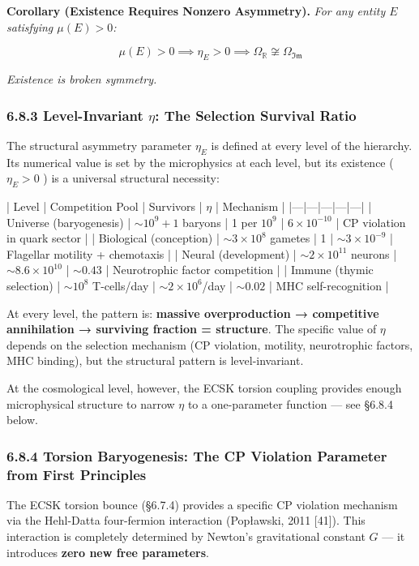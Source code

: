 \documentclass[11pt,a4paper]{article}
\theoremstyle{definition}
\theoremstyle{remark}
\begin{document}
\textbf{Corollary (Existence Requires Nonzero Asymmetry).} \textit{For any entity $E$ satisfying $\mu(E) > 0$:}


\begin{equation}
\mu(E) > 0 \implies \eta_E > 0 \implies \Omega_{\mathbb{R}} \not\cong \Omega_{\mathfrak{Im}}
\end{equation}


\textit{Existence is broken symmetry.}

\subsubsection{6.8.3 Level-Invariant $\eta$: The Selection Survival Ratio}

The structural asymmetry parameter $\eta_E$ is defined at every level of the hierarchy. Its numerical value is set by the microphysics at each level, but its existence ( $\eta_E > 0$ ) is a universal structural necessity:

| Level | Competition Pool | Survivors | $\eta$ | Mechanism |
|---|---|---|---|---|
| Universe (baryogenesis) | $\sim 10^9 + 1$ baryons | 1 per $10^9$ | $6 \times 10^{-10}$ | CP violation in quark sector |
| Biological (conception) | $\sim 3 \times 10^8$ gametes | 1 | $\sim 3 \times 10^{-9}$ | Flagellar motility + chemotaxis |
| Neural (development) | $\sim 2 \times 10^{11}$ neurons | $\sim 8.6 \times 10^{10}$ | $\sim 0.43$ | Neurotrophic factor competition |
| Immune (thymic selection) | $\sim 10^8$ T-cells/day | $\sim 2 \times 10^6$/day | $\sim 0.02$ | MHC self-recognition |

At every level, the pattern is: \textbf{massive overproduction → competitive annihilation → surviving fraction = structure}. The specific value of $\eta$ depends on the selection mechanism (CP violation, motility, neurotrophic factors, MHC binding), but the structural pattern is level-invariant.

At the cosmological level, however, the ECSK torsion coupling provides enough microphysical structure to narrow $\eta$ to a one-parameter function — see \S 6.8.4 below.

\subsubsection{6.8.4 Torsion Baryogenesis: The CP Violation Parameter from First Principles}

The ECSK torsion bounce (\S 6.7.4) provides a specific CP violation mechanism via the Hehl-Datta four-fermion interaction (Popławski, 2011 [41]). This interaction is completely determined by Newton's gravitational constant $G$ — it introduces \textbf{zero new free parameters}.
\end{document}
